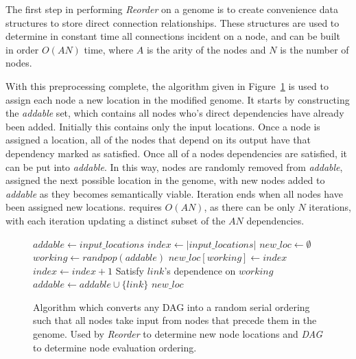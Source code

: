 \documentclass[journal]{IEEEtran}
\begin{document}
The first step in performing \emph{Reorder} on a genome is to create convenience
data structures to store direct connection relationships.  These structures are used
to determine in constant time all connections incident on a node, and 
can be built in order $O(AN)$ time, where $A$ is the arity of the nodes
and $N$ is the number of nodes.

With this preprocessing complete, the  algorithm given in Figure~\ref{fig:reorder}
is used to assign each node a new location in the modified genome.
It starts by constructing the \emph{addable} set, which contains all nodes who's direct
dependencies have already been added.  Initially this contains only the input locations.
Once a node is assigned a location, all of the nodes that depend on its output
have that dependency marked as satisfied.  Once all of a nodes dependencies
are satisfied, it can be put into \emph{addable}.  In this way, nodes are
randomly removed from \emph{addable}, assigned the next possible location
in the genome, with new nodes added to \emph{addable} as they becomes semantically
viable.  Iteration ends when all nodes have been assigned new locations.
 requires $O(AN)$, as there can be only $N$ iterations,
with each iteration updating a distinct subset of the $AN$ dependencies.

\begin{figure}
  \begin{algorithmic}
    \State $addable \leftarrow input\_locations$
    \State $index \leftarrow |input\_locations|$
    \State $new\_loc \leftarrow \emptyset$
      \State $working \leftarrow randpop(addable)$
        \State $new\_loc[working] \leftarrow index$
        \State $index \leftarrow index + 1$
      \EndIf
        \State Satisfy $link$'s dependence on $working$
          \State $addable \leftarrow addable \cup \{link\}$
        \EndIf
      \EndFor
    \EndWhile
    \State\Return $new\_loc$
    \EndProcedure
  \end{algorithmic}
  \caption{Algorithm which converts any DAG into a random serial ordering such
           that all nodes take input from nodes that precede them in the genome.
           Used by \emph{Reorder} to determine new node locations and \emph{DAG} to
           determine node evaluation ordering.}
  \label{fig:reorder}
\end{figure}
\end{document}
